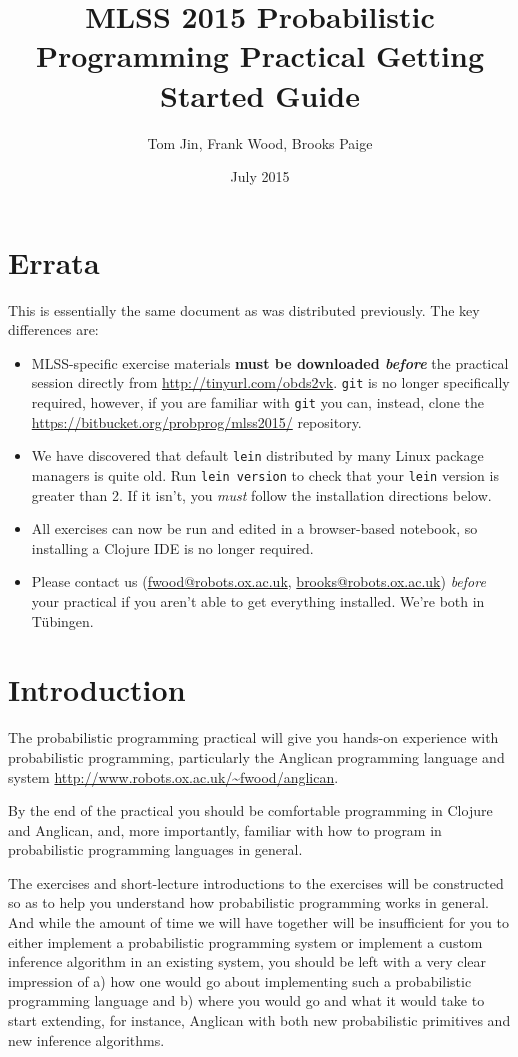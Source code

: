 \documentclass{article}
\title{MLSS 2015 Probabilistic Programming Practical Getting Started Guide}
\author{Tom Jin, Frank Wood, Brooks Paige}
\date{July 2015}
\begin{document}
\maketitle

\section{Errata}

This is essentially the same document as was distributed previously.  The key differences are:

\begin{itemize}
\item MLSS-specific exercise materials {\bf must be downloaded {\em before}} the practical session directly from 
\url{http://tinyurl.com/obds2vk}.  \texttt{git} is no longer specifically required, however, if you are familiar with \texttt{git} you can, instead, clone the  \url{https://bitbucket.org/probprog/mlss2015/} repository.
\item We have discovered that default \texttt{lein} distributed by many Linux package managers is quite old.  Run \texttt{lein version} to check that your \texttt{lein} version is greater than 2.  If it isn't, you {\em must} follow the installation directions below.
\item All exercises can now be run and edited in a browser-based notebook, so installing a Clojure IDE is no longer required.
\item Please contact us (\url{fwood@robots.ox.ac.uk}, \url{brooks@robots.ox.ac.uk}) {\em before} your practical if you aren't able to get everything installed.  We're both in T\"ubingen.
\end{itemize}


\section{Introduction}
The probabilistic programming practical will give you hands-on experience
with probabilistic programming, particularly the Anglican programming language
and system \url{http://www.robots.ox.ac.uk/~fwood/anglican}.

By the end of the practical you should be comfortable programming in Clojure 
and Anglican, and, more importantly, familiar with how to program in probabilistic
programming languages in general.

The exercises and short-lecture introductions to the exercises will be constructed
so as to help you understand how probabilistic programming works in general.  And while the 
amount of time we will have together will be insufficient for you to either implement
a probabilistic programming system or implement a custom inference algorithm in
an existing system, you should be left with a very clear impression of a) how
one would go about implementing such a probabilistic programming language  and 
b) where you would go and what it would take to start
extending, for instance, Anglican with both new probabilistic primitives and 
new inference algorithms.
\end{document}
